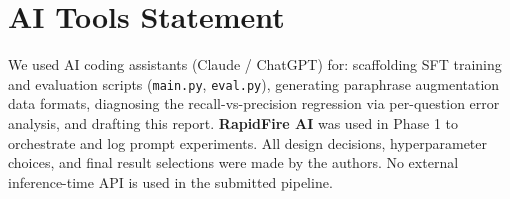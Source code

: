 \documentclass[10pt,twocolumn]{article}
\begin{document}
\appendix

\section{AI Tools Statement}
\label{app:ai_tools}

We used AI coding assistants (Claude / ChatGPT) for: scaffolding SFT training and evaluation scripts (\texttt{main.py}, \texttt{eval.py}), generating paraphrase augmentation data formats, diagnosing the recall-vs-precision regression via per-question error analysis, and drafting this report. \textbf{RapidFire AI} was used in Phase 1 to orchestrate and log prompt experiments. All design decisions, hyperparameter choices, and final result selections were made by the authors. No external inference-time API is used in the submitted pipeline.
\end{document}
